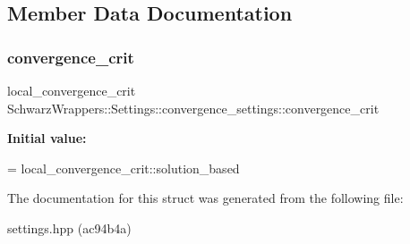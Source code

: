\subsection{Member Data Documentation}
\mbox{\label{structSchwarzWrappers_1_1Settings_1_1convergence__settings_ac02528dbce2827b664ba9e7545f1cfdc}} 
\subsubsection{\texorpdfstring{convergence\+\_\+crit}{convergence\_crit}}
{\footnotesize\ttfamily local\+\_\+convergence\+\_\+crit Schwarz\+Wrappers\+::\+Settings\+::convergence\+\_\+settings\+::convergence\+\_\+crit}

{\bfseries Initial value\+:}
\begin{DoxyCode}
=
            local\_convergence\_crit::solution\_based
\end{DoxyCode}


The documentation for this struct was generated from the following file\+:\begin{DoxyCompactItemize}
\item 
settings.\+hpp (ac94b4a)\end{DoxyCompactItemize}
